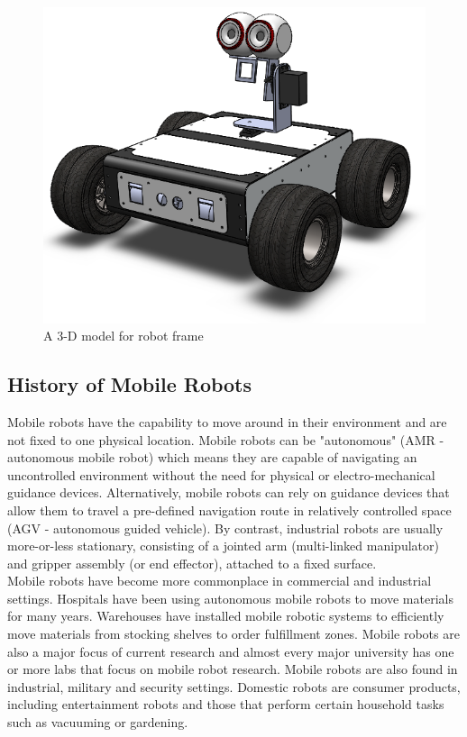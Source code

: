 \documentclass[12pt]{article}
\begin{document}
\begin{figure}[h]
\centering
\includegraphics[width =.4\textwidth]{Fig/Introduction.png}
\caption{ A 3-D model for robot frame}
\end{figure}


\subsection{History of Mobile Robots} 
Mobile robots have the capability to move around in their environment and are not fixed to one physical location. Mobile robots can be "autonomous" (AMR - autonomous mobile robot) which means they are capable of navigating an uncontrolled environment without the need for physical or electro-mechanical guidance devices. Alternatively, mobile robots can rely on guidance devices that allow them to travel a pre-defined navigation route in relatively controlled space (AGV - autonomous guided vehicle). By contrast, industrial robots are usually more-or-less stationary, consisting of a jointed arm (multi-linked manipulator) and gripper assembly (or end effector), attached to a fixed surface.\\
Mobile robots have become more commonplace in commercial and industrial settings. Hospitals have been using autonomous mobile robots to move materials for many years. Warehouses have installed mobile robotic systems to efficiently move materials from stocking shelves to order fulfillment zones. Mobile robots are also a major focus of current research and almost every major university has one or more labs that focus on mobile robot research. Mobile robots are also found in industrial, military and security settings. Domestic robots are consumer products, including entertainment robots and those that perform certain household tasks such as vacuuming or gardening. \cite{201}
\end{document}
